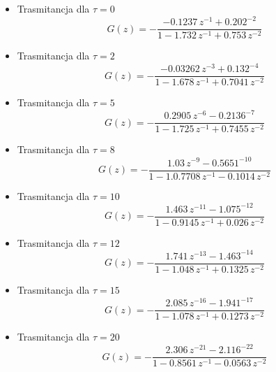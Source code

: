 \documentclass[a4paper, 11pt]{article}
\begin{document}
\begin{enumerate}
\newpage
\begin{itemize}
\item Trasmitancja dla \(\tau = 0 \)
\[G(z) = -\frac{-0.1237\,z^{-1}+0.202^{-2}}{1-1.732\,z^{-1}+0.753\,z^{-2}}\]
\item Trasmitancja dla \(\tau =  2\)
\[G(z) = -\frac{-0.03262\,z^{-3}+0.132^{-4}}{1-1.678\,z^{-1}+0.7041\,z^{-2}}\]
\item Trasmitancja dla \(\tau =  5\)
\[G(z) = -\frac{0.2905\,z^{-6}-0.2136^{-7}}{1-1.725\,z^{-1}+0.7455\,z^{-2}}\]
\item Trasmitancja dla \(\tau =  8\)
\[G(z) = -\frac{1.03\,z^{-9}-0.5651^{-10}}{1-1.0.7708\,z^{-1}-0.1014\,z^{-2}}\]
\item Trasmitancja dla \(\tau =  10\)
\[G(z) = -\frac{1.463\,z^{-11}-1.075^{-12}}{1-0.9145\,z^{-1}+0.026\,z^{-2}}\]
\item Trasmitancja dla \(\tau =  12\)
\[G(z) = -\frac{1.741\,z^{-13}-1.463^{-14}}{1-1.048\,z^{-1}+0.1325\,z^{-2}}\]
\item Trasmitancja dla \(\tau =  15\)
\[G(z) = -\frac{2.085\,z^{-16}-1.941^{-17}}{1-1.078\,z^{-1}+0.1273\,z^{-2}}\]
\item Trasmitancja dla \(\tau =  20\)
\[G(z) = -\frac{2.306\,z^{-21}-2.116^{-22}}{1-0.8561\,z^{-1}-0.0563\,z^{-2}}\]
\end{itemize}
\newpage


\end{enumerate}
\end{document}
